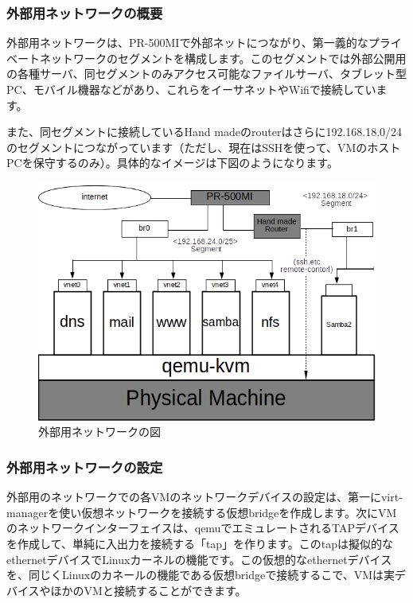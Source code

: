 \documentclass[mingoth,a4paper]{jsarticle}
\begin{document}
\subsubsection{外部用ネットワークの概要}
外部用ネットワークは、PR-500MIで外部ネットにつながり、第一義的なプライベートネットワークのセグメントを構成します。このセグメントでは外部公開用の各種サーバ、同セグメントのみアクセス可能なファイルサーバ、タブレット型PC、モバイル機器などがあり、これらをイーサネットやWifiで接続しています。

また、同セグメントに接続しているHand madeのrouterはさらに192.168.18.0/24のセグメントにつながっています（ただし、現在はSSHを使って、VMのホストPCを保守するのみ）。具体的なイメージは下図のようになります。

\begin{figure}[!h]
\centering
\includegraphics{image201803-kansai/external.png}
\caption{外部用ネットワークの図}
\end{figure}
\clearpage

\subsubsection{外部用ネットワークの設定}
外部用のネットワークでの各VMのネットワークデバイスの設定は、第一にvirt-managerを使い仮想ネットワークを接続する仮想bridgeを作成します。次にVMのネットワークインターフェイスは、qemuでエミュレートされるTAPデバイスを作成して、単純に入出力を接続する「tap」を作ります。このtapは擬似的なethernetデバイスでLinuxカーネルの機能です。この仮想的なethernetデバイスを、同じくLinuxのカネールの機能である仮想bridgeで接続するこで、VMは実デバイスやほかのVMと接続することができます。
\end{document}
